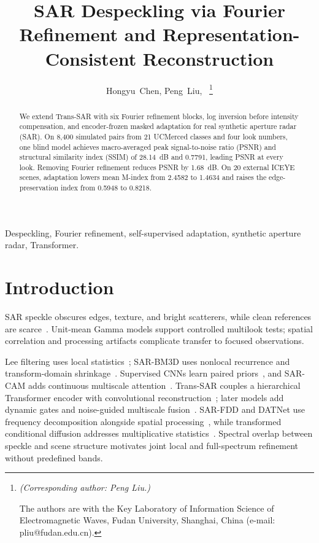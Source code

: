 \documentclass[journal]{IEEEtran}
\newcommand{\rev}[1]{{\color{RevisionBlue}#1}}
\newcommand{\condensed}[1]{{\color{CondensedGreen}#1}}
\newcommand{\rev}[1]{#1}
\newcommand{\condensed}[1]{#1}
\begin{document}
\title{SAR Despeckling via Fourier Refinement and
Representation-Consistent Reconstruction}

\author{Hongyu~Chen, Peng~Liu,~%
\thanks{\raggedright\emph{(Corresponding author: Peng Liu.)}\par
The authors are with the Key Laboratory of Information Science of Electromagnetic Waves, Fudan University, Shanghai, China (e-mail: \mbox{pliu@fudan.edu.cn}).}}

\maketitle

\begin{abstract}
\condensed{We extend Trans-SAR with six Fourier refinement blocks, log inversion before intensity compensation, and encoder-frozen masked adaptation for real synthetic aperture radar (SAR). On 8,400 simulated pairs from 21 UCMerced classes and four look numbers, one blind model achieves macro-averaged peak signal-to-noise ratio (PSNR) and structural similarity index (SSIM) of 28.14~dB and 0.7791, leading PSNR at every look. Removing Fourier refinement reduces PSNR by 1.68~dB. \rev{On 20 external ICEYE scenes, adaptation lowers mean M-index from 2.4582 to 1.4634 and raises the edge-preservation index from 0.5948 to 0.8218.}}
\end{abstract}

\begin{IEEEkeywords}
Despeckling, Fourier refinement, self-supervised adaptation, synthetic aperture radar, Transformer.
\end{IEEEkeywords}

\section{Introduction}
\condensed{SAR speckle obscures edges, texture, and bright scatterers, while clean references are scarce~\cite{fracastoro2021overview}. Unit-mean Gamma models support controlled multilook tests; spatial correlation and processing artifacts complicate transfer to focused observations.}

Lee filtering uses local statistics~\cite{lee1980}; SAR-BM3D uses nonlocal recurrence and transform-domain shrinkage~\cite{parrilli2012}. Supervised CNNs learn paired priors~\cite{chierchia2017}, and SAR-CAM adds continuous multiscale attention~\cite{ko2022}. Trans-SAR couples a hierarchical Transformer encoder with convolutional reconstruction~\cite{perera2022}; later models add dynamic gates and noise-guided multiscale fusion~\cite{shen2025,zhang2025}. SAR-FDD and DATNet use frequency decomposition alongside spatial processing~\cite{shen2025,zhao2024}, while transformed conditional diffusion addresses multiplicative statistics~\cite{ma2024}. Spectral overlap between speckle and scene structure motivates joint local and full-spectrum refinement without predefined bands.
\end{document}
